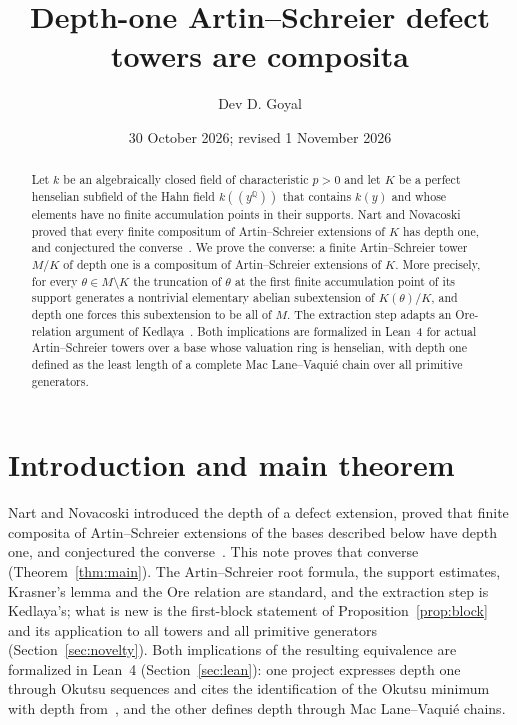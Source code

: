 \documentclass[11pt]{article}
\title{\textbf{Depth-one Artin--Schreier defect towers are composita}}
\author{Dev D. Goyal}
\date{30 October 2026; revised 1 November 2026}
\newcommand{\Q}{\mathbb Q}
\begin{document}
\maketitle

\begin{abstract}
Let $k$ be an algebraically closed field of characteristic $p>0$ and let $K$ be a perfect henselian subfield of the Hahn field $k((y^\Q))$ that contains $k(y)$ and whose elements have no finite accumulation points in their supports. Nart and Novacoski proved that every finite compositum of Artin--Schreier extensions of $K$ has depth one, and conjectured the converse~\cite[Conjecture~4.1]{NN}. We prove the converse: a finite Artin--Schreier tower $M/K$ of depth one is a compositum of Artin--Schreier extensions of $K$. More precisely, for every $\theta\in M\setminus K$ the truncation of $\theta$ at the first finite accumulation point of its support generates a nontrivial elementary abelian subextension of $K(\theta)/K$, and depth one forces this subextension to be all of $M$. The extraction step adapts an Ore-relation argument of Kedlaya~\cite{Ked}. Both implications are formalized in Lean~4 for actual Artin--Schreier towers over a base whose valuation ring is henselian, with depth one defined as the least length of a complete Mac Lane--Vaquié chain over all primitive generators.
\end{abstract}

\section{Introduction and main theorem}\label{sec:theorem}

Nart and Novacoski introduced the depth of a defect extension, proved that
finite composita of Artin--Schreier extensions of the bases described below
have depth one, and conjectured the converse~\cite[Theorem~3.15,
Conjecture~4.1]{NN}. This note proves that converse (Theorem~\ref{thm:main}).
The Artin--Schreier root formula, the support estimates, Krasner's lemma and
the Ore relation are standard, and the extraction step is Kedlaya's; what is
new is the first-block statement of Proposition~\ref{prop:block} and its
application to all towers and all primitive generators
(Section~\ref{sec:novelty}). Both implications of the resulting equivalence
are formalized in Lean~4 (Section~\ref{sec:lean}): one project expresses depth
one through Okutsu sequences and cites the identification of the Okutsu
minimum with depth from~\cite{NN}, and the other defines depth through Mac
Lane--Vaquié chains.
\end{document}
